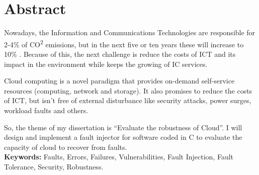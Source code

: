 \newpage
{}

\section*{Abstract}

Nowadays, the Information and Communications Technologies are responsible for 2-4\% of CO\textsuperscript{2} emissions, but in the next five or ten years these will increase to 10\% \cite{wolter2012resilience}. Because of this, the next challenge is reduce the costs of ICT and its impact in the environment while keeps the growing of IC services.


Cloud computing is a novel paradigm that provides on-demand self-service resources (computing, network and storage). It also promises to reduce the costs of ICT, but isn't free of external disturbance like security attacks, power surges, workload faults and others.

So, the theme of my dissertation is ``Evaluate the robustness of Cloud''. I will design and implement a fault injector for software coded in C to evaluate the capacity of cloud to recover from faults.\\





\textbf{Keywords:} Faults, Errors, Failures, Vulnerabilities, Fault Injection, Fault Tolerance, Security, Robustness.
